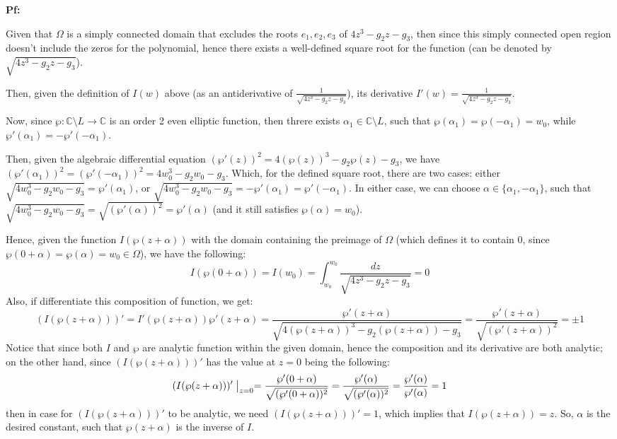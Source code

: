 \documentclass{article}
\begin{document}
\textbf{Pf:}

Given that $\Omega$ is a simply connected domain that excludes the roots $e_1,e_2,e_3$ of $4z^3-g_2z-g_3$,
then since this simply connected open region doesn't include the zeros for the polynomial, hence there exists a well-defined square root for the function
(can be denoted by $\sqrt{4z^3-g_2z-g_3}$).

Then, given the definition of $I(w)$ above (as an antiderivative of $\frac{1}{\sqrt{4z^3-g_2z-g_3}}$), its derivative $I'(w)=\frac{1}{\sqrt{4z^3-g_2z-g_3}}$.

\hfil

Now, since $\wp:\mathbb{C}\setminus L\rightarrow\mathbb{C}$ is an order 2 even elliptic function, then threre exists $\alpha_1\in \mathbb{C}\setminus L$, such that $\wp(\alpha_1)=\wp(-\alpha_1)=w_0$,
while $\wp'(\alpha_1) = -\wp'(-\alpha_1)$.

Then, given the algebraic differential equation $(\wp'(z))^2=4(\wp(z))^3-g_2\wp(z)-g_3$, we have $(\wp'(\alpha_1))^2=(\wp'(-\alpha_1))^2 = 4w_0^3-g_2w_0-g_3$. 
Which, for the defined square root, there are two cases: either $\sqrt{4w_0^3-g_2w_0-g_3} = \wp'(\alpha_1)$, or $\sqrt{4w_0^3-g_2w_0-g_3} = -\wp'(\alpha_1) = \wp'(-\alpha_1)$.
In either case, we can choose $\alpha\in \{\alpha_1,-\alpha_1\}$, such that $\sqrt{4w_0^3-g_2w_0-g_3} = \sqrt{(\wp'(\alpha))^2} = \wp'(\alpha)$ (and it still satisfies $\wp(\alpha)=w_0$).

Hence, given the function $I(\wp(z+\alpha))$ with the domain containing the preimage of $\Omega$ (which defines it to contain $0$, since $\wp(0+\alpha)=\wp(\alpha)=w_0\in\Omega$), we have the following:
$$I(\wp(0+\alpha)) = I(w_0)=\int_{w_0}^{w_0}\frac{dz}{\sqrt{4z^3-g_2z-g_3}} = 0$$
Also, if differentiate this composition of function, we get:
$$(I(\wp(z+\alpha)))' = I'(\wp(z+\alpha))\wp'(z+\alpha) = \frac{\wp'(z+\alpha)}{\sqrt{4(\wp(z+\alpha))^3-g_2(\wp(z+\alpha))-g_3}} = \frac{\wp'(z+\alpha)}{\sqrt{(\wp'(z+\alpha))^2}} = \pm 1$$
Notice that since both $I$ and $\wp$ are analytic function within the given domain, hence the composition and its derivative are both analytic;
on the other hand, since $(I(\wp(z+\alpha)))'$ has the value at $z=0$ being the following:
$$(I(\wp(z+\alpha)))'\bigm|_{z=0} = \frac{\wp'(0+\alpha)}{\sqrt{(\wp'(0+\alpha))^2}} = \frac{\wp'(\alpha)}{\sqrt{(\wp'(\alpha))^2}} = \frac{\wp'(\alpha)}{\wp'(\alpha)}=1$$
then in case for $(I(\wp(z+\alpha)))'$ to be analytic, we need $(I(\wp(z+\alpha)))' = 1$, which implies that $I(\wp(z+\alpha))=z$.
So, $\alpha$ is the desired constant, such that $\wp(z+\alpha)$ is the inverse of $I$.
\end{document}

